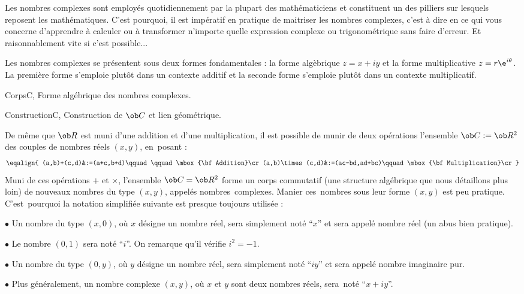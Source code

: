 Les nombres complexes sont employ\'es quotidiennement par la plupart des ma\-th\'e\-ma\-ti\-ciens et constituent un des pilliers sur lesquels reposent les math\'ematiques. 
C'est pourquoi, il est imp\'eratif en pratique de maitriser les nombres complexes, c'est \`a dire en ce qui vous concerne d'apprendre \`a calculer ou \`a transformer n'importe quelle expression complexe ou trigonom\'etrique sans faire d'erreur. Et raisonnablement vite si c'est possible...

Les nombres complexes se pr\'esentent sous deux formes fondamentales : la forme al\-g\`e\-bri\-que $z=x+iy$ 
et la forme multiplicative $z=r\e^{i\theta}$. La premi\`ere forme s'emploie plut\^ot dans un contexte additif 
et la seconde forme s'emploie plut\^ot dans un contexte multiplicatif. 



\Section CorpsC, Forme alg\'ebrique des nombres complexes. 

\Subsection ConstructionC, Construction de $\ob C$ et lien g\'eom\'etrique. 

De m\^eme que $\ob R$ est muni d'une addition et d'une multiplication, 
il est possible de munir de deux op\'erations l'ensemble $\ob C:=\ob R^2$ des couples de nombres r\'eels $(x,y)$, 
en~posant : 
$$
\eqalign{
(a,b)+(c,d)&:=(a+c,b+d)\qquad\qquad\mbox{\bf Addition}\cr
(a,b)\times(c,d)&:=(ac-bd,ad+bc)\qquad\mbox{\bf Multiplication}\cr
}%
$$
Muni de ces op\'erations $+$ et $\times$, l'ensemble $\ob C=\ob R^2$ forme un corps commutatif 
(une structure alg\'ebrique que nous d\'etaillons plus loin) de nouveaux nombres du type $(x,y)$, appel\'es nombres~complexes. 
Manier ces~nombres sous leur forme $(x,y)$ est peu pratique. 
C'est~pourquoi la notation simplifi\'ee suivante est presque toujours utilis\'ee : 
\medskip
\item{$\bullet$}
Un nombre du type $(x,0)$, o\`u $x$ d\'esigne un nombre r\'eel, sera simplement not\'e ``$x$'' et sera appel\'e nombre r\'eel (un abus bien pratique).
\medskip
\item{$\bullet$} 
Le nombre $(0,1)$ sera not\'e ``$i$''. On remarque qu'il v\'erifie $i^2=-1$. 
\medskip
\item{$\bullet$} 
Un nombre du type $(0,y)$, o\`u $y$ d\'esigne un nombre r\'eel, sera simplement not\'e ``$iy$'' et sera appel\'e nombre imaginaire pur. 
\medskip
\item{$\bullet$}
Plus g\'en\'eralement, un nombre complexe $(x,y)$, o\`u $x$ et $y$ sont deux nombres r\'eels, sera~not\'e ``$x+iy$''. 
\bigskip

